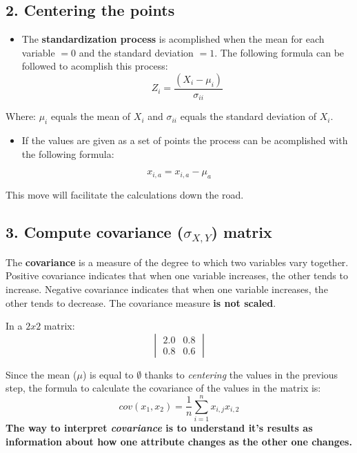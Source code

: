 \documentclass[]{book}
\providecommand{\tightlist}{%
  \setlength{\itemsep}{0pt}\setlength{\parskip}{0pt}}
\begin{document}
\subsection{2. Centering the points}\label{centering-the-points}

\begin{itemize}
\tightlist
\item
  The \textbf{standardization process} is acomplished when the mean for
  each variable \(=0\) and the standard deviation \(=1\). The following
  formula can be followed to acomplish this process:
  \[Z_i = \frac {(X_i-\mu_i)}{\sigma_{ii}}\]
\end{itemize}

Where: \(\mu_i\) equals the mean of \(X_i\) and \(\sigma_{ii}\) equals
the standard deviation of \(X_i\).

\begin{itemize}
\tightlist
\item
  If the values are given as a set of points the process can be
  acomplished with the following formula:
\end{itemize}

\[x_{i,a} = x_{i,a} - \mu_a\]

This move will facilitate the calculations down the road.

\subsection{\texorpdfstring{3. Compute covariance (\(\sigma_{X,Y}\))
matrix}{3. Compute covariance (\textbackslash{}sigma\_\{X,Y\}) matrix}}\label{compute-covariance-sigma_xy-matrix}

The \textbf{covariance} is a measure of the degree to which two
variables vary together. Positive covariance indicates that when one
variable increases, the other tends to increase. Negative covariance
indicates that when one variable increases, the other tends to decrease.
The covariance measure \textbf{is not scaled}.

In a \(2x2\) matrix: \[\begin{vmatrix}
2.0 & 0.8 \\
0.8 & 0.6
\end{vmatrix}\]

Since the mean (\(\mu\)) is equal to \(\emptyset\) thanks to
\emph{centering} the values in the previous step, the formula to
calculate the covariance of the values in the matrix is:
\[cov(x_1,x_2) = \frac{1}{n}\sum_{i=1}^{n}x_{i,j}x_{i,2}\] \textbf{The
way to interpret \emph{covariance} is to understand it's results as
information about how one attribute changes as the other one changes.}
\end{document}
